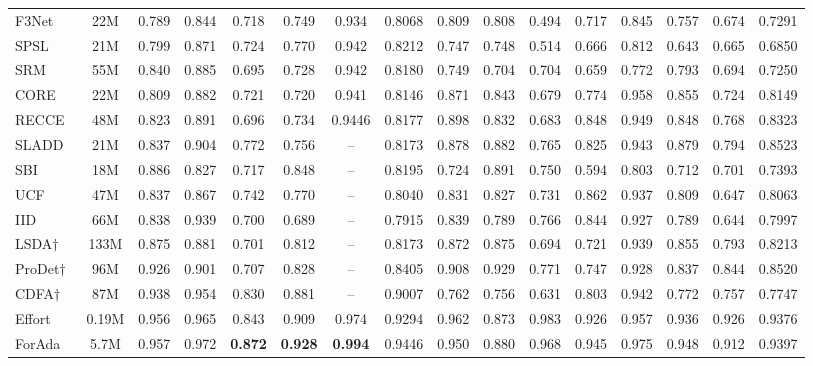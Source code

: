 \documentclass[fonts]{icst}
\begin{document}
\begin{strip}
{\begin{tabular}{l c cccccc cccccccc}
F3Net~\cite{qian2020frequency} & 22M & 0.789 & 0.844 & 0.718 & 0.749 & 0.934 & 0.8068 & 0.809 & 0.808 & 0.494 & 0.717 & 0.845 & 0.757 & 0.674 & 0.7291 \\
SPSL~\cite{liu2021spsl} & 21M & 0.799 & 0.871 & 0.724 & 0.770 & 0.942 & 0.8212 & 0.747 & 0.748 
& 0.514 & 0.666 & 0.812 & 0.643 & 0.665 & 0.6850 \\
SRM~\cite{luo2021srm} & 55M & 0.840 & 0.885 & 0.695 & 0.728 & 0.942 & 0.8180 & 0.749 & 0.704 & 0.704 & 0.659 & 0.772 & 0.793 & 0.694 & 0.7250 \\
CORE~\cite{ni2022core} & 22M & 0.809 & 0.882 & 0.721 & 0.720 & 0.941 & 0.8146 & 0.871 & 0.843 & 0.679 & 0.774 & 0.958 & 0.855 & 0.724 & 0.8149 \\
RECCE~\cite{cao2022recce} & 48M & 0.823 & 0.891 & 0.696 & 0.734 & 0.9446 & 0.8177 & 0.898 & 0.832 & 0.683 & 0.848 & 0.949 & 
0.848 & 0.768 & 0.8323 \\
SLADD~\cite{gu2022slad} & 21M & 0.837 & 0.904 & 0.772 & 0.756 & -- & 0.8173 & 0.878 & 0.882 & 0.765 & 0.825 & 0.943 & 0.879 & 0.794 & 0.8523 \\
SBI~\cite{shiohara2022sbi} & 18M & 0.886 & 0.827 & 0.717 & 0.848 & -- & 0.8195 & 0.724 & 0.891 & 0.750 & 0.594 & 0.803 & 0.712 & 0.701 & 0.7393 \\
UCF~\cite{yan2023ucf} & 47M & 0.837 & 0.867 & 0.742 & 0.770 & -- & 0.8040 & 0.831 & 0.827 & 0.731 & 0.862 & 0.937 & 0.809 & 0.647 & 0.8063 \\
IID~\cite{huang2023iid} & 
66M & 0.838 & 0.939 & 0.700 & 0.689 & -- & 0.7915 & 0.839 & 0.789 & 0.766 & 0.844 & 0.927 & 0.789 & 0.644 & 0.7997 \\
LSDA$\dagger$~\cite{sun2024lsda} & 133M & 0.875 & 0.881 & 0.701 & 0.812 & -- & 0.8173 & 0.872 & 0.875 & 0.694 & 0.721 & 0.939 & 0.855 & 0.793 & 0.8213 \\
ProDet$\dagger$~\cite{yang2024prodet} & 96M & 0.926 & 0.901 & 0.707 & 0.828 & -- & 0.8405 & 0.908 & 0.929 & 0.771 & 0.747 & 0.928 & 0.837 & 0.844 & 0.8520 \\
CDFA$\dagger$~\cite{lin2024cdfa} & 87M & 0.938 & 0.954 & 0.830 
& 0.881 & -- & 0.9007 & 0.762 & 0.756 & 0.631 & 0.803 & 0.942 & 0.772 & 0.757 & 0.7747 \\
Effort~\cite{yan2025effort} & 0.19M & 0.956 & 0.965 & 0.843 & 0.909 & 0.974 & 0.9294 & 0.962 & 0.873 & \cellcolor{gray!15}0.983 & 0.926 & 0.957 & 0.936 & 0.926 & 0.9376 \\
ForAda~\cite{cui2025forada} & 5.7M & 0.957 & \cellcolor{gray!15}0.972 & \textbf{0.872} & \textbf{0.928} & \textbf{0.994} & \cellcolor{gray!15}0.9446 & 0.950 & 0.880 & 0.968 & 0.945 & \cellcolor{gray!15}0.975 & 0.948 & 0.912 & 0.9397 \\

\end{tabular}}
\end{strip}
\end{document}
